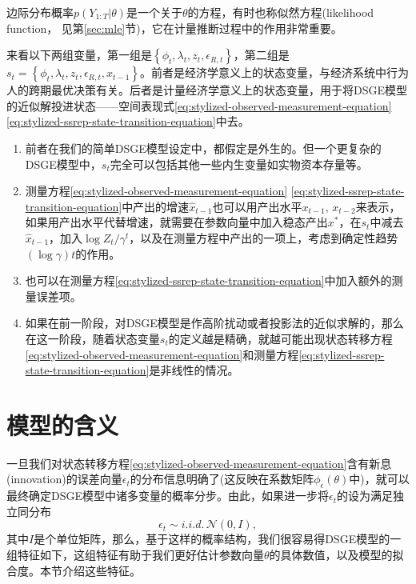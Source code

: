 边际分布概率$p \left( Y_{1:T} | \theta \right)$是一个关于$\theta$的方程，有时也称似然方程(likelihood function， 见第\ref{sec:mle}节)，它在计量推断过程中的作用非常重要。

\begin{remark}[``状态"变量]
  来看以下两组变量，第一组是$\left\{ \phi_{t}, \lambda_{t}, z_{t}, \epsilon_{R,t} \right\}$，第二组是$s_{t} = \left\{ \phi_{t}, \lambda_{t}, z_{t}, \epsilon_{R,t}, \hat{x}_{t-1} \right\}$。前者是经济学意义上的状态变量，与经济系统中行为人的跨期最优决策有关。后者是计量经济学意义上的状态变量，用于将DSGE模型的近似解投进状态——空间表现式\eqref{eq:stylized-observed-measurement-equation} \eqref{eq:stylized-ssrep-state-transition-equation}中去。

  \begin{enumerate}
    \item 前者在我们的简单DSGE模型设定中，都假定是外生的。但一个更复杂的DSGE模型中，$s_{t}$完全可以包括其他一些内生变量如实物资本存量等。
    \item 测量方程\eqref{eq:stylized-observed-measurement-equation} \eqref{eq:stylized-ssrep-state-transition-equation}中产出的增速$\hat{x}_{t-1}$也可以用产出水平$x_{t-1}, \, x_{t-2}$来表示，如果用产出水平代替增速，就需要在参数向量中加入稳态产出$x^{*}$，在$s_{t}$中减去$\hat{x}_{t-1}$，加入$\log Z_{t}/\gamma^{t}$，以及在测量方程中产出的一项上，考虑到确定性趋势$\left( \log \gamma \right) t$的作用。
    \item 也可以在测量方程\eqref{eq:stylized-ssrep-state-transition-equation}中加入额外的测量误差项。
    \item 如果在前一阶段，对DSGE模型是作高阶扰动或者投影法的近似求解的，那么在这一阶段，随着状态变量$s_{t}$的定义越是精确，就越可能出现状态转移方程\eqref{eq:stylized-observed-measurement-equation}和测量方程\eqref{eq:stylized-ssrep-state-transition-equation}是非线性的情况。
  \end{enumerate}
\end{remark}

\section{模型的含义}
\label{sec:stylized-model-implications}
一旦我们对状态转移方程\eqref{eq:stylized-observed-measurement-equation}含有新息(innovation)的误差向量$\epsilon_{t}$的分布信息明确了(这反映在系数矩阵$\phi_{\epsilon} \left( \theta \right)$中)，就可以最终确定DSGE模型中诸多变量的概率分步。由此，如果进一步将$\epsilon_{t}$的设为满足独立同分布
\begin{equation*}
  \epsilon_{t} \sim i.i.d. \, \mathcal{N} \left(0, I \right),
\end{equation*}
其中$I$是个单位矩阵，那么，基于这样的概率结构，我们很容易得DSGE模型的一组特征如下，这组特征有助于我们更好估计参数向量$\theta$的具体数值，以及模型的拟合度。本节介绍这些特征。

